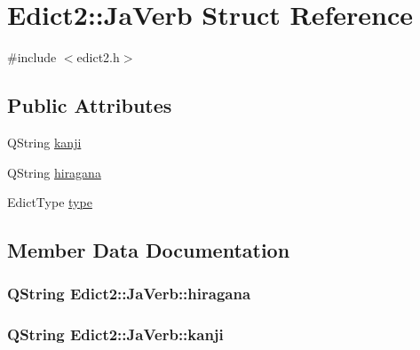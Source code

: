 \hypertarget{struct_edict2_1_1_ja_verb}{}\section{Edict2\+:\+:Ja\+Verb Struct Reference}
\label{struct_edict2_1_1_ja_verb}


{\ttfamily \#include $<$edict2.\+h$>$}

\subsection*{Public Attributes}
\begin{DoxyCompactItemize}
\item 
Q\+String \hyperlink{struct_edict2_1_1_ja_verb_ad475022674b9a9d0e795f50586d4ba99}{kanji}
\item 
Q\+String \hyperlink{struct_edict2_1_1_ja_verb_aeeb10cd2c52d733738c2236bbbeb7bd4}{hiragana}
\item 
Edict\+Type \hyperlink{struct_edict2_1_1_ja_verb_afd43ce42c23585223a81b18ff69345f6}{type}
\end{DoxyCompactItemize}


\subsection{Member Data Documentation}
\subsubsection[{\texorpdfstring{hiragana}{hiragana}}]{\setlength{\rightskip}{0pt plus 5cm}Q\+String Edict2\+::\+Ja\+Verb\+::hiragana}\hypertarget{struct_edict2_1_1_ja_verb_aeeb10cd2c52d733738c2236bbbeb7bd4}{}\label{struct_edict2_1_1_ja_verb_aeeb10cd2c52d733738c2236bbbeb7bd4}
\subsubsection[{\texorpdfstring{kanji}{kanji}}]{\setlength{\rightskip}{0pt plus 5cm}Q\+String Edict2\+::\+Ja\+Verb\+::kanji}\hypertarget{struct_edict2_1_1_ja_verb_ad475022674b9a9d0e795f50586d4ba99}{}\label{struct_edict2_1_1_ja_verb_ad475022674b9a9d0e795f50586d4ba99}
